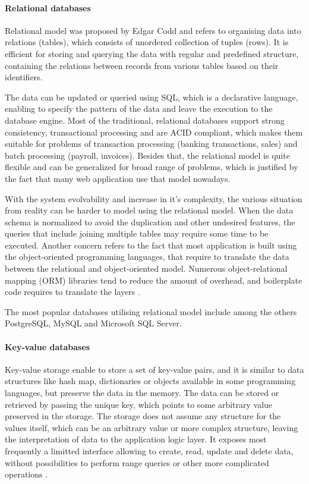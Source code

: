 \paragraph*{Relational databases}

Relational model was proposed by Edgar Codd and refers to organising data into relations (tables), which consists of unordered collection of tuples (rows). It is efficient for storing and querying the data with regular and predefined structure, containing the relations between records from various tables based on their identifiers.

The data can be updated or queried using SQL, which is a declarative language, enabling to specify the pattern of the data and leave the execution to the database engine. Most of the traditional, relational databases support strong consistency, transactional processing and are ACID compliant, which makes them suitable for problems of transaction processing (banking transactions, sales) and batch processing (payroll, invoices). Besides that, the relational model is quite flexible and can be generalized for broad range of problems, which is justified by the fact that many web application use that model nowadays.

With the system evolvability and increase in it's complexity, the various situation from reality can be harder to model using the relational model. When the data schema is normalized to avoid the duplication and other undesired features, the queries that include joining multiple tables may require some time to be executed. Another concern refers to the fact that most application is built using the object-oriented programming languages, that require to translate the data between the relational and object-oriented model. Numerous object-relational mapping (ORM) libraries tend to reduce the amount of overhead, and boilerplate code requires to translate the layers \cite{DesignDataIntensiveApplications}.

The most popular databases utilising relational model include among the others PostgreSQL, MySQL and Microsoft SQL Server.

\paragraph*{Key-value databases}

Key-value storage enable to store a set of key-value pairs, and it is similar to data structures like hash map, dictionaries or objects available in some programming languages, but preserve the data in the memory. The data can be stored or retrieved by passing the unique key, which points to some arbitrary value preserved in the storage.
The storage does not assume any structure for the values itself, which can be an arbitrary value or more complex structure, leaving the interpretation of data to the application logic layer.
It exposes most frequently a limitted interface allowing to create, read, update and delete data, without possibilities to perform range queries or other more complicated operations \cite{NoSQLDatabaseSystemsSurveyDecisionGuidance}.


